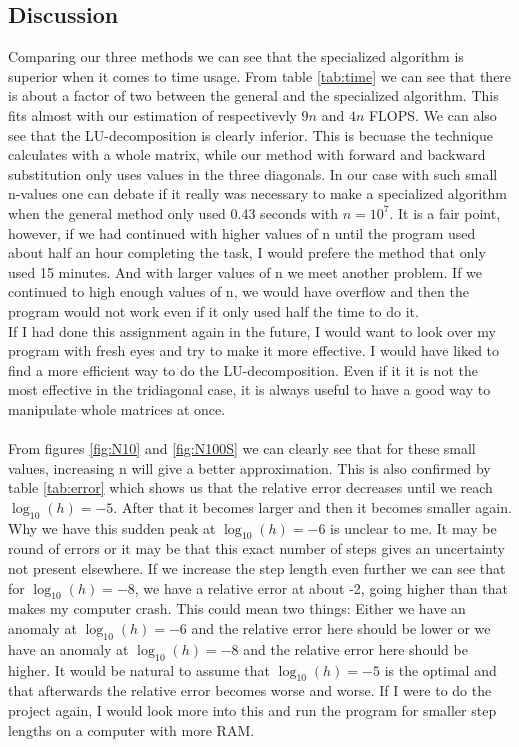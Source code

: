 \documentclass[12pt,a4paper]{article}
\begin{document}
\subsection*{Discussion}
Comparing our three methods we can see that the specialized algorithm is superior when it comes to time usage. From table \ref{tab:time} we can see  that there is about a factor of two between the general and the specialized algorithm. This fits almost with our estimation of respectivevly $9n$ and $4n$ FLOPS. We can also see that the LU-decomposition is clearly inferior. This is becuase the technique calculates with a whole matrix, while our method with forward and backward substitution only uses values in the three diagonals. In our case with such small n-values one can debate if it really was necessary to make a specialized algorithm when the general method only used 0.43 seconds with $n = 10^7$. It is a fair point, however, if we had continued with higher values of n until the program used about half an hour completing the task, I would prefere the method that only used 15 minutes. And with larger values of n we meet another problem. If we continued to high enough values of n, we would have overflow and then the program would not work even if it only used half the time to do it.  \\ 
If I had done this assignment again in the future, I would want to look over my program with fresh eyes and try to make it more effective. I would have liked to find a more efficient way to do the LU-decomposition. Even if it it is not the most effective in the tridiagonal case, it is always useful to have a good way to manipulate whole matrices at once. \\ \\
From figures \ref{fig:N10} and \ref{fig:N100S} we can clearly see that for these small values, increasing n will give a better approximation. This is also confirmed by table \ref{tab:error} which shows us that the relative error decreases until we reach $\log_{10}(h) = -5$. After that it becomes larger and then it becomes smaller again. Why we have this sudden peak at $\log_{10}(h) = -6$ is unclear to me. It may be round of errors or it may be that this exact number of steps gives an uncertainty not present elsewhere. If we increase the step length even further we can see that for $\log_{10}(h) = -8$, we have a relative error at about -2, going higher than that makes my computer crash. This could mean two things: Either we have an anomaly at $\log_{10}(h) = -6$ and the relative error here should be lower or we have an anomaly at $\log_{10}(h) = -8$ and the relative error here should be higher. It would be natural to assume that $\log_{10}(h) = -5$ is the optimal and that afterwards the relative error becomes worse and worse. If I were to do the project again, I would look more into this and run the program for smaller step lengths on a computer with more RAM.
\end{document}
